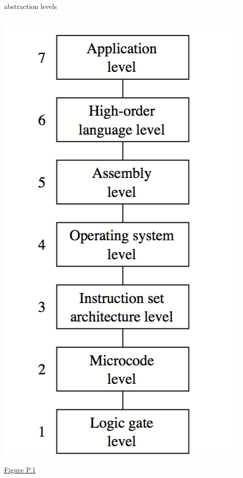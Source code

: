 \documentclass[10pt,t,svgnames]{beamer}
\begin{document}
  \begin{frame}{abstraction levels}
    \vspace{3ex}
    \begin{columns}
      \begin{column}{.34\textwidth}
        \includegraphics[width=\textwidth]{levels.png}\\
        \hfill \tiny{\href{http://computersystemsbook.com/resources}{Figure P.1}}
      \end{column}
    \end{columns}
  \end{frame}
\end{document}
